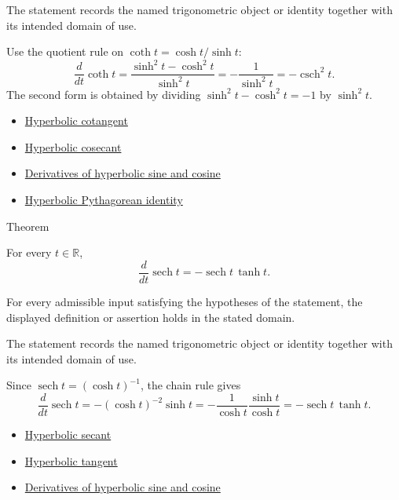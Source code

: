 \begin{remark*}[Interpretation]
The statement records the named trigonometric object or identity together with
its intended domain of use.
\end{remark*}

\begin{remark*}[Proof]
Use the quotient rule on $\operatorname{coth}t=\cosh t/\sinh t$:
\[
  \frac{d}{dt}\operatorname{coth}t
  =
  \frac{\sinh^2 t-\cosh^2 t}{\sinh^2 t}
  =
  -\frac{1}{\sinh^2 t}
  =
  -\operatorname{csch}^2 t.
\]
The second form is obtained by dividing
$\sinh^2 t-\cosh^2 t=-1$ by $\sinh^2 t$.
\end{remark*}
\begin{dependencies}
\begin{itemize}
  \item \hyperref[def:hyperbolic-cotangent]{Hyperbolic cotangent}
  \item \hyperref[def:hyperbolic-cosecant]{Hyperbolic cosecant}
  \item \hyperref[thm:hyperbolic-sinh-cosh-derivatives]{Derivatives of hyperbolic sine and cosine}
  \item \hyperref[thm:hyperbolic-pythagorean-identity]{Hyperbolic Pythagorean identity}
\end{itemize}
\end{dependencies}

\begin{theorembox}{Theorem}
\begin{theorem}
\label{thm:hyperbolic-secant-derivative}
For every $t\in\mathbb{R}$,
\[
  \frac{d}{dt}\operatorname{sech}t
  =-\operatorname{sech}t\,\tanh t.
\]
\end{theorem}
\end{theorembox}
\begin{remark*}
For every admissible input satisfying the hypotheses of the statement, the
displayed definition or assertion holds in the stated domain.
\end{remark*}

\begin{remark*}[Interpretation]
The statement records the named trigonometric object or identity together with
its intended domain of use.
\end{remark*}

\begin{remark*}[Proof]
Since $\operatorname{sech}t=(\cosh t)^{-1}$, the chain rule gives
\[
  \frac{d}{dt}\operatorname{sech}t
  =
  -(\cosh t)^{-2}\sinh t
  =
  -\frac{1}{\cosh t}\frac{\sinh t}{\cosh t}
  =
  -\operatorname{sech}t\,\tanh t.
\]
\end{remark*}
\begin{dependencies}
\begin{itemize}
  \item \hyperref[def:hyperbolic-secant]{Hyperbolic secant}
  \item \hyperref[def:hyperbolic-tangent]{Hyperbolic tangent}
  \item \hyperref[thm:hyperbolic-sinh-cosh-derivatives]{Derivatives of hyperbolic sine and cosine}
\end{itemize}
\end{dependencies}

